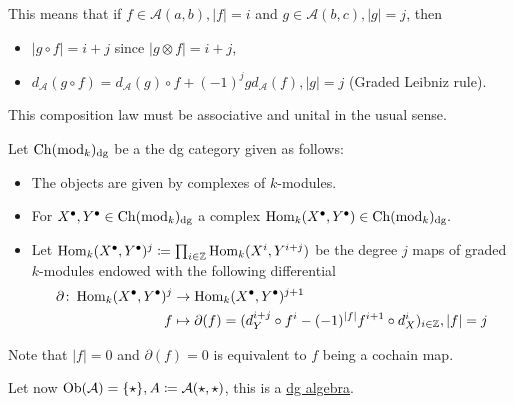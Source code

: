 \begin{rmk}
	This means that if $ f \in \mathcal{ A } ( a , b ) , \lvert f \rvert = i $ and $ g \in \mathcal{ A } ( b , c ), \lvert g \rvert = j $, then
	\begin{itemize}
		\item 
		$ \lvert g \circ f \rvert = i + j $ since $ \lvert g \otimes f \rvert = i + j $,
		
		\item 
		$ d_{ \mathcal{ A } } ( g \circ f ) = d_{ \mathcal{ A } } ( g ) \circ f + ( - 1 )^j g d_{ \mathcal{A} } ( f ), \lvert g \rvert = j $ (Graded Leibniz rule).
	\end{itemize}
	This composition law must be associative and unital in the usual sense.
\end{rmk}

\begin{exmp}
	Let $ \operatorname{Ch} ( \operatorname{mod}_k )_{ \operatorname{dg} } $ be a the dg category given as follows:
	\begin{itemize}
		\item 
		The objects are given by complexes of $ k $-modules.
		
		\item 
		For $ X^\bullet , Y^\bullet \in \operatorname{Ch} ( \operatorname{mod}_k )_{ \operatorname{dg} } $ a complex $ \operatorname{Hom}_k ( X^\bullet , Y^\bullet ) \in \operatorname{Ch} ( \operatorname{mod}_k )_{ \operatorname{dg} }.$
		
		\item 
		Let $ \operatorname{Hom}_k ( X^\bullet , Y^\bullet )^j \coloneqq \prod_{ i \in \mathbb{ Z } } \operatorname{Hom}_k ( X^i , Y^{ i + j } ) $ be the degree $ j $ maps of graded $ k $-modules endowed with the following differential
		\begin{align*}
			\partial \colon \operatorname{Hom}_k ( X^\bullet , Y^\bullet )^j
			&\to
			\operatorname{Hom}_k ( X^\bullet , Y^\bullet )^{ j + 1 }
			\\
			f
			&\mapsto
			\partial ( f ) 
			=
			( d_Y^{ i + j } \circ f^i - ( - 1 )^{ \lvert f \rvert } f^{ i + 1 } \circ d_X^i )_{ i \in \mathbb{ Z } }, \lvert f \rvert = j 
		\end{align*} 
	\end{itemize}
	Note that $ \lvert f \rvert = 0 $ and $ \partial ( f ) = 0 $ is equivalent to $ f $ being a cochain map.
\end{exmp}

\begin{exmp}		
	Let now $ \operatorname{Ob} ( \mathcal{ A } ) = \{ \star \}, A \coloneqq \mathcal{ A } ( \star, \star ) $, this is a \underline{dg algebra}.
\end{exmp}

